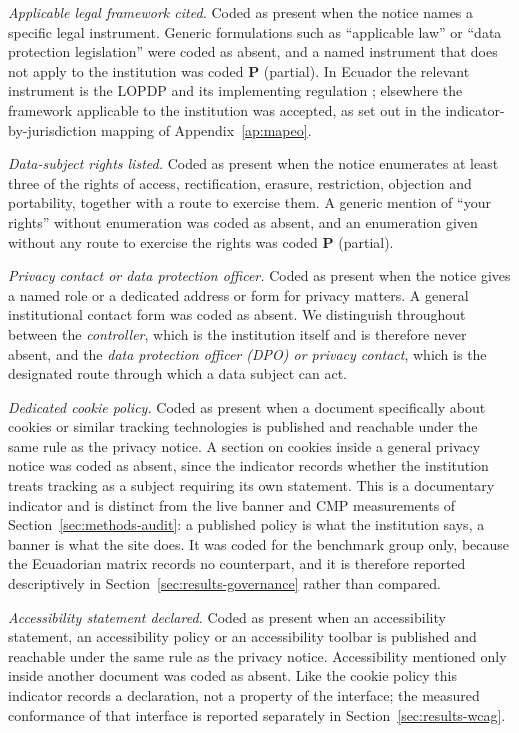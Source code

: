 \documentclass[pdflatex,sn-basic,Numbered,iicol]{sn-jnl}
\theoremstyle{thmstyleone}
\theoremstyle{thmstyletwo}
\theoremstyle{thmstylethree}
\begin{document}
\emph{Applicable legal framework cited.} Coded as present when the notice names a specific legal instrument. Generic formulations such as ``applicable law'' or ``data protection legislation'' were coded as absent, and a named instrument that does not apply to the institution was coded \textbf{P} (partial). In Ecuador the relevant instrument is the LOPDP and its implementing regulation \citep{lopdp2021,reglamentolopdp2023}; elsewhere the framework applicable to the institution was accepted, as set out in the indicator-by-jurisdiction mapping of Appendix~\ref{ap:mapeo}.

\emph{Data-subject rights listed.} Coded as present when the notice enumerates at least three of the rights of access, rectification, erasure, restriction, objection and portability, together with a route to exercise them. A generic mention of ``your rights'' without enumeration was coded as absent, and an enumeration given without any route to exercise the rights was coded \textbf{P} (partial).

\emph{Privacy contact or data protection officer.} Coded as present when the notice gives a named role or a dedicated address or form for privacy matters. A general institutional contact form was coded as absent. We distinguish throughout between the \emph{controller}, which is the institution itself and is therefore never absent, and the \emph{data protection officer (DPO) or privacy contact}, which is the designated route through which a data subject can act.

\emph{Dedicated cookie policy.} Coded as present when a document specifically about cookies or similar tracking technologies is published and reachable under the same rule as the privacy notice. A section on cookies inside a general privacy notice was coded as absent, since the indicator records whether the institution treats tracking as a subject requiring its own statement. This is a documentary indicator and is distinct from the live banner and CMP measurements of Section~\ref{sec:methods-audit}: a published policy is what the institution says, a banner is what the site does. It was coded for the benchmark group only, because the Ecuadorian matrix records no counterpart, and it is therefore reported descriptively in Section~\ref{sec:results-governance} rather than compared.

\emph{Accessibility statement declared.} Coded as present when an accessibility statement, an accessibility policy or an accessibility toolbar is published and reachable under the same rule as the privacy notice. Accessibility mentioned only inside another document was coded as absent. Like the cookie policy this indicator records a declaration, not a property of the interface; the measured conformance of that interface is reported separately in Section~\ref{sec:results-wcag}.
\end{document}
